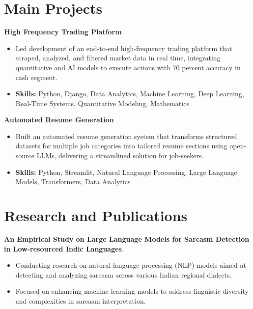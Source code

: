 \documentclass[a4paper,11pt]{article}
\begin{document}
\section{\textbf{Main Projects}}

\vspace{1mm}
  \textbf{High Frequency Trading Platform  }
\vspace{-1.5mm} %
\begin{itemize}
  \item Led development of an end-to-end high-frequency trading platform that scraped, analyzed, and filtered market data in real time, integrating quantitative and AI models to execute actions with 70 percent accuracy in cash segment.
\vspace{-3mm}
  \item \textbf{Skills:} Python, Django, Data Analytics, Machine Learning, Deep Learning, Real-Time Systems, Quantitative Modeling, Mathematics
\end{itemize}


\vspace{1mm}
   \textbf{Automated Resume Generation }
\vspace{-1.5mm} %
\begin{itemize}
  \item Built an automated resume generation system that transforms structured datasets for multiple job categories into tailored resume sections using open-source LLMs, delivering a streamlined solution for job-seekers.
\vspace{-3mm}
  \item \textbf{Skills:} Python, Streamlit, Natural Language Processing, Large Language Models, Transformers, Data Analytics
\end{itemize}



\section{\textbf{Research and Publications} \hfill }
\vspace{1mm}
  \textbf{An Empirical Study on Large Language Models for Sarcasm Detection in Low-resourced Indic Languages}.
\vspace{-1mm} %
\begin{itemize}
  \item Conducting research on natural language processing (NLP) models aimed at detecting and analyzing sarcasm across various Indian regional dialects.
\vspace{-3mm}
  \item Focused on enhancing machine learning models to address linguistic diversity and complexities in sarcasm interpretation.
\end{itemize}
\end{document}
